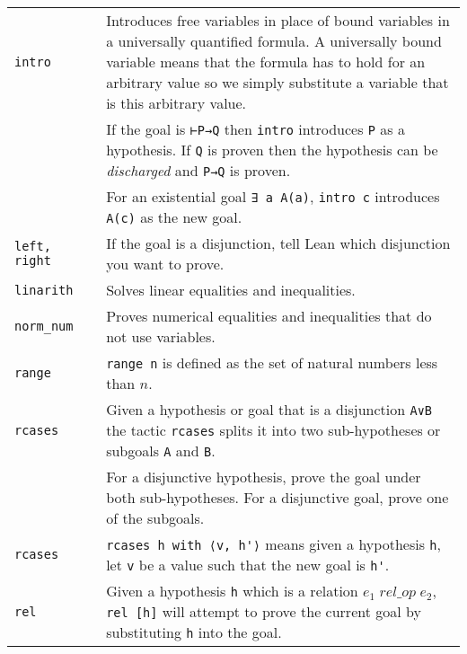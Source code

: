 \begin{tabular}{p{}|r|p{}}
\Verb+intro+&\pageref{p.intro}&Introduces free variables in place of bound variables in a universally quantified formula. A universally bound variable means that the formula has to hold for an arbitrary value so we simply substitute a variable that is this arbitrary value.\\
&&If the goal is \Verb+⊢P→Q+ then \Verb+intro+ introduces \Verb+P+ as a hypothesis. If \Verb+Q+ is proven then the hypothesis can be \emph{discharged} and \Verb+P→Q+ is proven.\\
&&For an existential goal \Verb+∃ a A(a)+, \Verb+intro c+ introduces \Verb+A(c)+ as the new goal.\\\hline

\Verb+left, right+ &\pageref{p.left-right}& If the goal is a disjunction, tell Lean which disjunction you want to prove.\\\hline

\Verb+linarith+&\pageref{p.linarith}&Solves linear equalities and inequalities.\\\hline

\Verb+norm_num+&\pageref{p.norm-num}&Proves numerical equalities and inequalities that do not use variables.\\\hline

\Verb+range+&\pageref{p.range}&\Verb+range n+ is defined as the set of natural numbers less than $n$.\\\hline

\Verb+rcases+&\pageref{p.rcases}&Given a hypothesis or goal that is a disjunction \Verb+A∨B+ the tactic \Verb+rcases+ splits it into two sub-hypotheses or subgoals \Verb+A+ and \Verb+B+.\\
&&For a disjunctive hypothesis, prove the goal under both sub-hypotheses. For a disjunctive goal, prove one of the subgoals.\\\hline

\Verb+rcases+&\pageref{p.rcases-with}&\Verb+rcases h with ⟨v, h'⟩+ means given a hypothesis \Verb+h+, let \Verb+v+ be a value such that the new goal is \Verb+h'+.\\\hline

\Verb+rel+&\pageref{p.rel}&Given a hypothesis \Verb+h+ which is a relation $\mathit{e_1 \; rel\_op \; e_2}$, \Verb+rel [h]+ will attempt to prove the current goal by substituting \Verb+h+ into the goal.\\\hline
\end{tabular}

